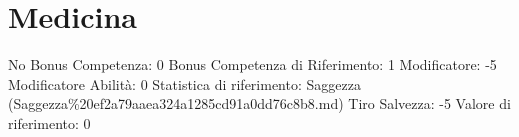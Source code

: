 \section{Medicina}\label{medicina}

\begin{description}
\tightlist
\item[Tags: ABI]
No Bonus Competenza: 0 Bonus Competenza di Riferimento: 1 Modificatore:
-5 Modificatore Abilità: 0 Statistica di riferimento: Saggezza
(Saggezza\%20ef2a79aaea324a1285cd91a0dd76c8b8.md) Tiro Salvezza: -5
Valore di riferimento: 0
\end{description}
